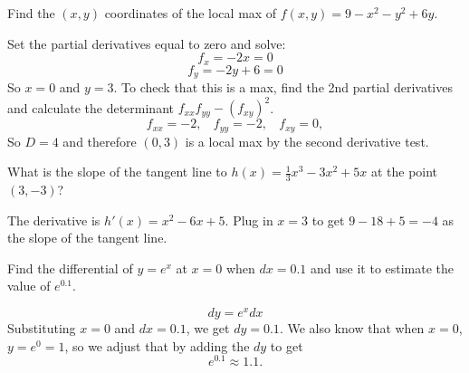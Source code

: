 \documentclass[12pt]{exam}
\begin{document}
\begin{questions}
\begin{parts}
\vfill

\vfill
\end{parts}

\question Find the $(x,y)$ coordinates of the local max of $f(x,y) = 9 - x^2 - y^2 + 6y$. 
\begin{solution}
Set the partial derivatives equal to zero and solve:
$$f_x = -2x = 0$$
$$f_y = -2y + 6 = 0$$
So $x = 0$ and $y = 3$. 
To check that this is a max, find the 2nd partial derivatives and calculate the determinant $f_{xx} f_{yy} - (f_{xy})^2$. 
$$f_{xx} = -2, ~~~~ f_{yy} = -2, ~~~~ f_{xy}  = 0, $$
So $D = 4$ and therefore $(0,3)$ is a local max by the second derivative test.
\end{solution}
\vfill

\newpage


\question What is the slope of the tangent line to $h(x) = \tfrac{1}{3}x^3 - 3x^2 + 5x$ at the point $(3,-3)$?
\begin{solution}
The derivative is $h'(x) = x^2 - 6x + 5$.  Plug in $x=3$ to get $9 - 18 + 5 = -4$ as the slope of the tangent line. 
\end{solution}
\vfill

\question Find the differential of $y = e^{x}$ at $x = 0$ when $dx = 0.1$ and use it to estimate the value of $e^{0.1}$. 
\begin{solution}
$$dy = e^x dx$$
Substituting $x = 0$ and $dx = 0.1$, we get $dy = 0.1$.  We also know that when $x=0$, $y = e^0 = 1$, so we adjust that by adding the $dy$ to get 
$$e^{0.1} \approx 1.1.$$
\end{solution}


\end{questions}
\end{document}
